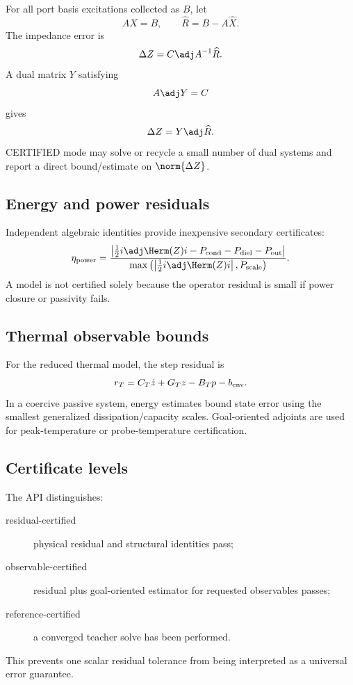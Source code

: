 For all port basis excitations collected as $B$, let
\[
 AX=B,\qquad \widehat R=B-A\widehat X.
\]
The impedance error is
\[
 \Delta Z
 =
 C\adj A^{-1}\widehat R.
\]
A dual matrix $Y$ satisfying
\[
 A\adj Y=C
\]
gives
\[
 \Delta Z=Y\adj\widehat R.
\]
CERTIFIED mode may solve or recycle a small number of dual systems and report a
direct bound/estimate on $\norm{\Delta Z}$.

\subsection{Energy and power residuals}

Independent algebraic identities provide inexpensive secondary certificates:
\[
 \eta_{\rm power}
 =
 \frac{
  \left|
    \frac12 i\adj\Herm(Z)i
    -P_{\rm cond}-P_{\rm diel}-P_{\rm out}
  \right|
 }{
  \max\left(
   \left|\frac12 i\adj\Herm(Z)i\right|,
   P_{\rm scale}
  \right)
 }.
\]
A model is not certified solely because the operator residual is small if power
closure or passivity fails.

\subsection{Thermal observable bounds}

For the reduced thermal model, the step residual is
\[
 r_T
 =
 C_T\dot z+G_Tz-B_Tp-b_{\rm env}.
\]
In a coercive passive system, energy estimates bound state error using the
smallest generalized dissipation/capacity scales. Goal-oriented adjoints are
used for peak-temperature or probe-temperature certification.

\subsection{Certificate levels}

The API distinguishes:
\begin{description}
\item[residual-certified] physical residual and structural identities pass;
\item[observable-certified] residual plus goal-oriented estimator for requested
  observables passes;
\item[reference-certified] a converged teacher solve has been performed.
\end{description}
This prevents one scalar residual tolerance from being interpreted as a
universal error guarantee.

